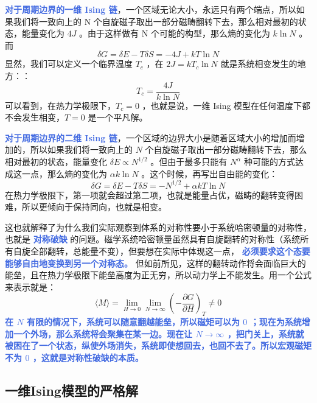 \textcolor{RoyalBlue}{\textbf{\kaishu 对于周期边界的一维 Ising 链}}，一个区域无论大小，永远只有两个端点，所以如果我们将一致向上的 N 个自旋磁子取出一部分磁畴翻转下去，那么相对最初的状态，能量变化为 $4J$ 。由于这样做有 N 个可能的构型，那么熵的变化为 $k\ln N$ 。而 
\[
    \delta G = \delta E - T\delta S = -4J + kT\ln N
\]
显然，我们可以定义一个临界温度 $T_c$ ，在 $2J = kT_c \ln N$ 就是系统相变发生的地方：：
\begin{equation}\label{equ:一维Ising模型的临界温度}
    T_c = \frac{4J}{k\ln N}
\end{equation}
可以看到，在热力学极限下，$T_c = 0$ ，也就是说，一维 Ising 模型在任何温度下都不会发生相变，$T = 0$ 是一个平凡解。

\textcolor{RoyalBlue}{\textbf{\kaishu 对于周期边界的二维 Ising 链}}，一个区域的边界大小是随着区域大小的增加而增加的，所以如果我们将一致向上的 $N$ 个自旋磁子取出一部分磁畴翻转下去，那么相对最初的状态，能量变化 $\delta E \propto N^{1/2}$ 。但由于最多只能有 $N^\alpha$ 种可能的方式达成这一点，那么熵的变化为 $\alpha k\ln N$ 。这个时候，再写出自由能的变化：
\[
    \delta G = \delta E - T\delta S = -N^{1/2} + \alpha kT\ln N
\]
在热力学极限下，第一项就会超过第二项，也就是能量占优，磁畴的翻转变得困难，所以更倾向于保持同向，也就是相变。

这也就解释了为什么我们实际观察到体系的对称性要小于系统哈密顿量的对称性，也就是 \textcolor{RoyalBlue}{\textbf{\kaishu 对称破缺}} 的问题。磁学系统哈密顿量虽然具有自旋翻转的对称性（系统所有自旋全部翻转，总能量不变），但要想在实际中体现这一点， \textcolor{RoyalBlue}{\textbf{\kaishu 必须要求这个态要能够自由地变换到另一个对称态。}} 但如前所见，这样的翻转动作将会面临巨大的能垒，且在热力学极限下能垒高度为正无穷，所以动力学上不能发生。用一个公式来表示就是：
\begin{equation}\label{equ:对称性破缺}
    \langle M \rangle  = \lim_{H\rightarrow 0}  \lim_{N\rightarrow \infty} \left(-\frac{\partial G}{\partial H}\right)_T \neq 0  
\end{equation}
\textcolor{RoyalBlue}{\textbf{\kaishu 在 $N$ 有限的情况下，系统可以随意翻越能垒，所以磁矩可以为 $0$ ；现在为系统增加一个外场，那么系统将会聚集在某一边。现在让 $N\rightarrow \infty$ ，把门关上，系统就被困在了一个状态，纵使外场消失，系统即使想回去，也回不去了。所以宏观磁矩不为 $0$ ，这就是对称性破缺的本质。}}

\subsection{一维Ising模型的严格解}

